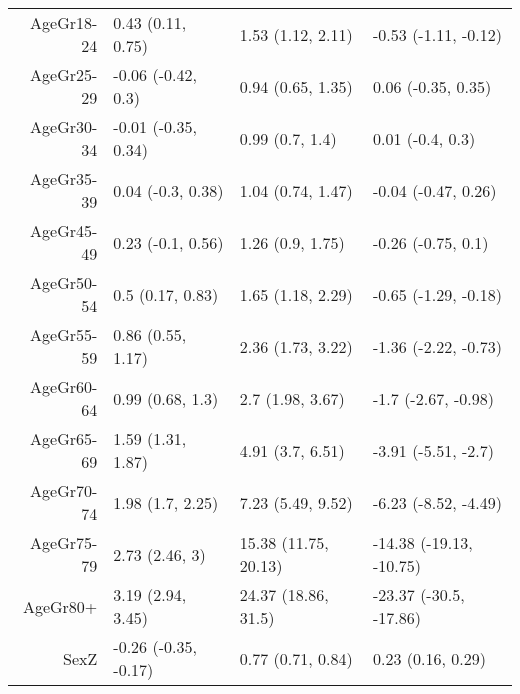 \begin{table}[ht]
\begin{tabular}{rlll}
  AgeGr18-24 & 0.43 (0.11, 0.75) & 1.53 (1.12, 2.11) & -0.53 (-1.11, -0.12) \\ 
  AgeGr25-29 & -0.06 (-0.42, 0.3) & 0.94 (0.65, 1.35) & 0.06 (-0.35, 0.35) \\ 
  AgeGr30-34 & -0.01 (-0.35, 0.34) & 0.99 (0.7, 1.4) & 0.01 (-0.4, 0.3) \\ 
  AgeGr35-39 & 0.04 (-0.3, 0.38) & 1.04 (0.74, 1.47) & -0.04 (-0.47, 0.26) \\ 
  AgeGr45-49 & 0.23 (-0.1, 0.56) & 1.26 (0.9, 1.75) & -0.26 (-0.75, 0.1) \\ 
  AgeGr50-54 & 0.5 (0.17, 0.83) & 1.65 (1.18, 2.29) & -0.65 (-1.29, -0.18) \\ 
  AgeGr55-59 & 0.86 (0.55, 1.17) & 2.36 (1.73, 3.22) & -1.36 (-2.22, -0.73) \\ 
  AgeGr60-64 & 0.99 (0.68, 1.3) & 2.7 (1.98, 3.67) & -1.7 (-2.67, -0.98) \\ 
  AgeGr65-69 & 1.59 (1.31, 1.87) & 4.91 (3.7, 6.51) & -3.91 (-5.51, -2.7) \\ 
  AgeGr70-74 & 1.98 (1.7, 2.25) & 7.23 (5.49, 9.52) & -6.23 (-8.52, -4.49) \\ 
  AgeGr75-79 & 2.73 (2.46, 3) & 15.38 (11.75, 20.13) & -14.38 (-19.13, -10.75) \\ 
  AgeGr80+ & 3.19 (2.94, 3.45) & 24.37 (18.86, 31.5) & -23.37 (-30.5, -17.86) \\ 
  SexZ & -0.26 (-0.35, -0.17) & 0.77 (0.71, 0.84) & 0.23 (0.16, 0.29) \\ 
   \hline
\end{tabular}
\end{table}

